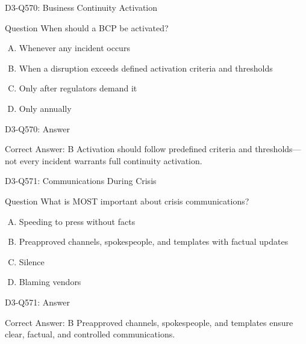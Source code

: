 \documentclass{beamer}
\begin{document}
	\begin{frame}{D3-Q570: Business Continuity Activation}
		\begin{block}{Question}
			When should a BCP be activated?
		\end{block}
		\begin{enumerate}[(A)]
			\item Whenever any incident occurs
			\item When a disruption exceeds defined activation criteria and thresholds
			\item Only after regulators demand it
			\item Only annually
		\end{enumerate}
	\end{frame}
	\begin{frame}{D3-Q570: Answer}
		\begin{block}{Correct Answer: B}
			Activation should follow predefined criteria and thresholds—not every incident warrants full continuity activation.
		\end{block}
	\end{frame}
	
	\begin{frame}{D3-Q571: Communications During Crisis}
		\begin{block}{Question}
			What is MOST important about crisis communications?
		\end{block}
		\begin{enumerate}[(A)]
			\item Speeding to press without facts
			\item Preapproved channels, spokespeople, and templates with factual updates
			\item Silence
			\item Blaming vendors
		\end{enumerate}
	\end{frame}
	\begin{frame}{D3-Q571: Answer}
		\begin{block}{Correct Answer: B}
			Preapproved channels, spokespeople, and templates ensure clear, factual, and controlled communications.
		\end{block}
	\end{frame}
	
\end{document}
